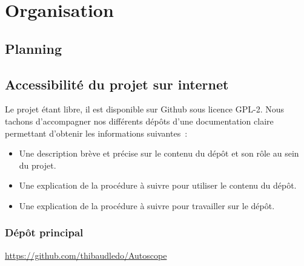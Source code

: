 \chapter{Organisation}

\section{Planning}%

\section{Accessibilité du projet sur internet}

Le projet étant libre, il est disponible sur Github sous licence GPL-2. Nous tachons d'accompagner nos différents dépôts d'une documentation claire permettant d'obtenir les informations suivantes~:
\begin{itemize}[label=$\bullet$]
	\item Une description brève et précise sur le contenu du dépôt et son rôle au sein du projet.
	\item Une explication de la procédure à suivre pour utiliser le contenu du dépôt.
	\item Une explication de la procédure à suivre pour travailler sur le dépôt.
	\end{itemize}

\subsection{Dépôt principal}

\url{https://github.com/thibaudledo/Autoscope}

\vspace{1cm}

